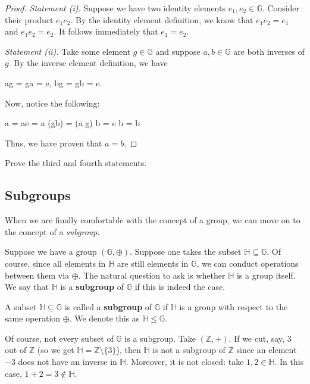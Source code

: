\documentclass[../../book.tex]{subfiles}
\begin{document}
\begin{proof}
\textit{Statement (i).} Suppose we have two identity elements $e_1, e_2 \in
\mathbb{G}$. Consider their product $e_1e_2$. By the identity element
definition, we know that $e_1e_2 = e_1$ and $e_1e_2 = e_2$. It follows
immediately that $e_1=e_2$.

\textit{Statement (ii).} Take some element $g \in \mathbb{G}$ and suppose $a, b \in \mathbb{G}$ are both inverses of $g$. 
By the inverse element definition, we have
\begin{xequation}
    ag = ga = e, \quad bg = gb = e.
\end{xequation}
Now, notice the following:
\begin{xequation}
    a = ae = a (gb) = (a g) b = e b = b
\end{xequation}
Thus, we have proven that $a = b$.
\end{proof}

\begin{exercise}
    Prove the third and fourth statements.
\end{exercise}

\subsection{Subgroups}

When we are finally comfortable with the concept of a group, we can move on to the concept of a \textit{subgroup}. 

Suppose we have a group $(\mathbb{G},\oplus)$. Suppose one takes the subset 
$\mathbb{H} \subseteq \mathbb{G}$. Of course, since all elements in $\mathbb{H}$ are still 
elements in $\mathbb{G}$, we can conduct operations between them via $\oplus$. 
The natural question to ask is whether $\mathbb{H}$ is a group itself. We say that 
$\mathbb{H}$ is a \textbf{subgroup} of $\mathbb{G}$ if this is indeed the case.

\begin{definition}
    A subset $\mathbb{H} \subseteq \mathbb{G}$ is called a \textbf{subgroup} of
    $\mathbb{G}$ if $\mathbb{H}$ is a group with respect to the same operation
    $\oplus$. 
    We denote this as $\mathbb{H} \leq \mathbb{G}$.
\end{definition}

\begin{example}
    Of course, not every subset of $\mathbb{G}$ is a subgroup. Take $(\mathbb{Z}, +)$. If we cut, say, $3$ out of 
    $\mathbb{Z}$ (so we get $\mathbb{H} = \mathbb{Z} \setminus \{3\}$), then $\mathbb{H}$ is not a subgroup of 
    $\mathbb{Z}$ since an element $-3$ does not have an inverse in $\mathbb{H}$. Moreover, it is not closed: 
    take $1,2 \in \mathbb{H}$. In this case, $1+2 = 3 \notin \mathbb{H}$.
\end{example}
\end{document}
